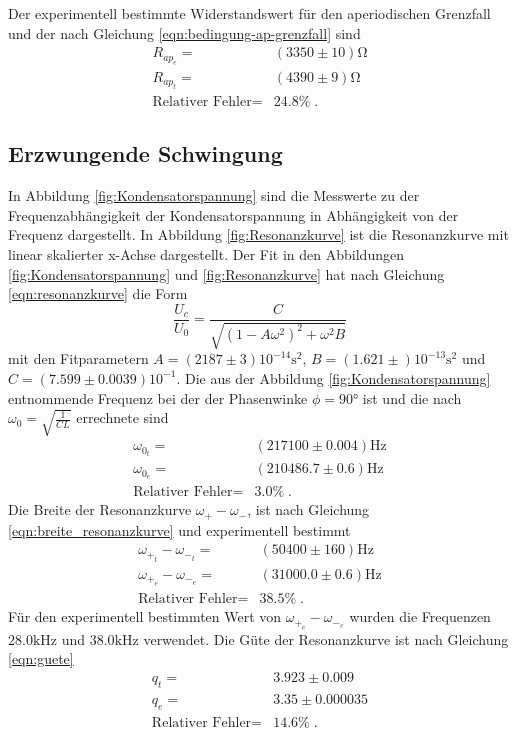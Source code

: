 Der experimentell bestimmte Widerstandswert für den aperiodischen Grenzfall
und  der nach Gleichung \eqref{eqn:bedingung-ap-grenzfall} sind
\begin{align*}
  R_{ap_e}=&(3350\pm10)\si{\ohm}\\
  R_{ap_t}=&(4390\pm9)\si{\ohm}\\
  \text{Relativer Fehler}=&24.8\%\;.
\end{align*}

\subsection{Erzwungende Schwingung}
In Abbildung \ref{fig:Kondensatorspannung} sind die
Messwerte zu der Frequenzabhängigkeit der Kondensatorspannung in Abhängigkeit
von der Frequenz dargestellt. In Abbildung \ref{fig:Resonanzkurve} ist die
Resonanzkurve mit linear skalierter x-Achse dargestellt. Der Fit  in den Abbildungen
\ref{fig:Kondensatorspannung} und \ref{fig:Resonanzkurve} hat nach
Gleichung \eqref{eqn:resonanzkurve} die Form
\begin{equation}
\frac{U_c}{U_0}=\frac{C}{\sqrt{(1-A\omega^2)^2+\omega^2 B}}
\end{equation}
mit den Fitparametern $A=(2187\pm3)10^{-14}\si{\second}^2$, $B=(1.621\pm)10^{-13}\si{\second}^2$ und
$C=(7.599\pm0.0039)10^{-1}$.
Die aus der Abbildung \ref{fig:Kondensatorspannung}
entnommende Frequenz bei der der Phasenwinke $\phi=90°$ ist und die
nach $\omega_0=\sqrt{\frac{1}{CL}}$ errechnete sind
\begin{align*}
\omega_{0_t}=&(217100\pm0.004)\si{\hertz}\\
\omega_{0_e}=&(210486.7\pm0.6)\si{\hertz}\\
\text{Relativer Fehler}=&3.0\%\;.
\end{align*}
 Die Breite der
Resonanzkurve $\omega_+-\omega_- $, ist nach Gleichung \eqref{eqn:breite_resonanzkurve}
 und experimentell bestimmt
\begin{align*}
 \omega_{+_t}-\omega_{-_t}=&(50400\pm160)\si{\hertz}\\
 \omega_{+_e}-\omega_{-_e}=&(31000.0\pm0.6)\si{\hertz}\\
 \text{Relativer Fehler}=&38.5\%\;.
\end{align*}
Für den experimentell bestimmten Wert von $\omega_{+_e}-\omega_{-_e}$ wurden
die Frequenzen $28.0\si{\kilo\hertz}$ und $38.0\si{\kilo\hertz}$ verwendet.
Die Güte der Resonanzkurve ist nach Gleichung \eqref{eqn:guete}
\begin{align*}
  q_t=&3.923\pm0.009\\
  q_e=&3.35\pm0.000035\\
  \text{Relativer Fehler}=&14.6\%\;.
\end{align*}
